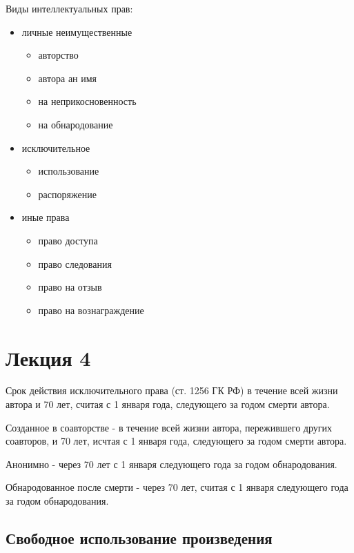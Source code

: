\documentclass[12pt]{article}
\begin{document}
Виды интеллектуальных прав:
\begin{itemize}
    \item личные неимущественные
    \begin{itemize}
    \item авторство
    \item автора ан имя
    \item на неприкосновенность
    \item на обнародование
    \end{itemize}
    \item исключительное
    \begin{itemize}
    \item использование
    \item распоряжение
    \end{itemize}   
    \item иные права
    \begin{itemize}
    \item право доступа
    \item право следования
    \item право на отзыв
    \item право на вознаграждение
\end{itemize}   
\end{itemize}
\section{Лекция 4}
Срок действия исключительного права (ст. 1256 ГК РФ)
в течение всей жизни автора и 70 лет, считая с 1 
января года, следующего за годом смерти автора.

Созданное в соавторстве - в течение всей жизни автора, 
пережившего других соавторов, и 70 лет, исчтая с 1 января года,
следующего за годом смерти автора.

Анонимно - через 70 лет с 1 января следующего года за годом обнародования.

Обнародованное после смерти - через 70 лет, считая 
с 1 января следующего года за годом обнародования.
\hypertarget{ux441ux432ux43eux431ux43eux434ux43dux43eux435-ux438ux441ux43fux43eux43bux44cux437ux43eux432ux430ux43dux438ux435-ux43fux440ux43eux438ux437ux432ux435ux434ux435ux43dux438ux44f}{%
\subsection{Свободное использование
произведения}\label{ux441ux432ux43eux431ux43eux434ux43dux43eux435-ux438ux441ux43fux43eux43bux44cux437ux43eux432ux430ux43dux438ux435-ux43fux440ux43eux438ux437ux432ux435ux434ux435ux43dux438ux44f}}
\end{document}
